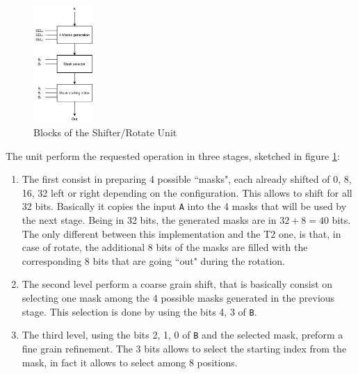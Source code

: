 \begin{figure}[ht]
	\centering
	\includegraphics[width=0.2\textwidth]{chapters/5_ExecuteStage/images/Shifter.pdf}
	\caption{Blocks of the Shifter/Rotate Unit}
	\label{fig:shifter}
\end{figure}

 The unit perform the requested operation in three stages, sketched in figure \ref{fig:shifter}:
\begin{enumerate}
	\item The first consist in preparing 4 possible ``masks", each already shifted of {0, 8, 16, 32} left
	or right depending on the configuration. This allows to shift for all 32 bits. Basically it copies
	the input \texttt{A} into the 4 masks that will be used by the next stage. Being in 32 bits, the generated masks are in $32+8=40$ bits. The only different between this implementation and the T2 one, is that, in case of rotate, the additional 8 bits of the masks are filled with the corresponding 8 bits that are going ``out" during the rotation.
	
	\item The second level perform a coarse grain shift, that is basically consist on selecting one mask
	among the 4 possible masks generated in the previous stage. This selection is done by using the bits {4, 3} of \texttt{B}.
	\item The third level, using the bits {2, 1, 0} of \texttt{B} and the selected mask, preform a fine grain refinement. The 3 bits allows to select the starting index from the mask, in fact it allows to select among 8 positions.
\end{enumerate}



